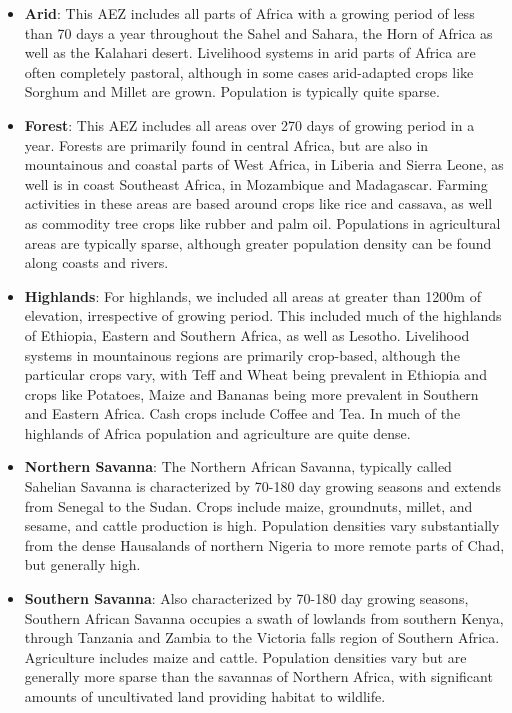 \documentclass{article}
\begin{document}
\begin{itemize}
	\item \textbf{Arid}: This AEZ includes all parts of Africa with a growing period of less than 70 days a year throughout the Sahel and Sahara, the Horn of Africa as well as the Kalahari desert.  Livelihood systems in arid parts of Africa are often completely pastoral, although in some cases arid-adapted crops like Sorghum and Millet are grown.  Population is typically quite sparse.
	\item \textbf{Forest}: This AEZ includes all areas over 270 days of growing period in a year.  Forests are primarily found in central Africa, but are also in mountainous and coastal parts of West Africa, in Liberia and Sierra Leone, as well is in coast Southeast Africa, in Mozambique and Madagascar.  Farming activities in these areas are based around crops like rice and cassava, as well as commodity tree crops like rubber and palm oil.  Populations in agricultural areas are typically sparse, although greater population density can be found along coasts and rivers.
	\item \textbf{Highlands}: For highlands, we included all areas at greater than 1200m of elevation, irrespective of growing period.  This included much of the highlands of Ethiopia, Eastern and Southern Africa, as well as Lesotho.  Livelihood systems in mountainous regions are primarily crop-based, although the particular crops vary, with Teff and Wheat being prevalent in Ethiopia and crops like Potatoes, Maize and Bananas being more prevalent in Southern and Eastern Africa.  Cash crops include Coffee and Tea.  In much of the highlands of Africa population and agriculture are quite dense.
	\item \textbf{Northern Savanna}:  The Northern African Savanna, typically called Sahelian Savanna is characterized by 70-180 day growing seasons and extends from Senegal to the Sudan.  Crops include maize, groundnuts, millet, and sesame, and cattle production is high.  Population densities vary substantially from the dense Hausalands of northern Nigeria to more remote parts of Chad, but generally high.
	\item \textbf{Southern Savanna}: Also characterized by 70-180 day growing seasons, Southern African Savanna occupies a swath of lowlands from southern Kenya, through Tanzania and Zambia to the Victoria falls region of Southern Africa.  Agriculture includes maize and cattle.  Population densities vary but are generally more sparse than the savannas of Northern Africa, with significant amounts of uncultivated land providing habitat to wildlife.

\end{itemize}
\end{document}
